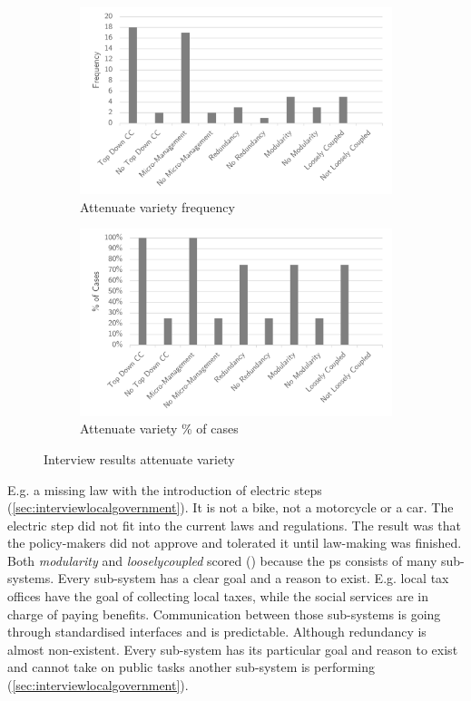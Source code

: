 \begin{figure}[H]
	\centering
	\begin{subfigure}[H]{0.5\textwidth}
		\centering
		\includegraphics[width=0.95\linewidth]{images/attenuate_frequency}
		\caption[Attenuate variety frequency]{Attenuate variety frequency}
		\label{fig:attenuatefrequency}
	\end{subfigure}%
	\begin{subfigure}[H]{0.5\textwidth}
		\centering
		\includegraphics[width=0.95\linewidth]{images/attenuate_cases}
		\caption[Attenuate variety \% of cases]{Attenuate variety \% of cases}
		\label{fig:attenuatecases}
	\end{subfigure}
	\caption[Interview results attenuate variety]{Interview results attenuate variety}
	\label{fig:interviewattenuatevariety}
\end{figure}
E.g. a missing law with the introduction of electric steps (\cref{sec:interviewlocalgovernment}). It is not a bike, not a motorcycle or a car. The electric step did not fit into the current laws and regulations. The result was that the policy-makers did not approve and tolerated it until law-making was finished. Both \textit{\gls{modularity}} and \textit{\gls{looselycoupled}} scored () because the \gls{ps} consists of many sub-systems. Every sub-system has a clear goal and a reason to exist. E.g. local tax offices have the goal of collecting local taxes, while the social services are in charge of paying benefits. Communication between those sub-systems is going through standardised interfaces and is predictable. Although \gls{redundancy} is almost non-existent. Every sub-system has its particular goal and reason to exist and cannot take on public tasks another sub-system is performing (\cref{sec:interviewlocalgovernment}).
